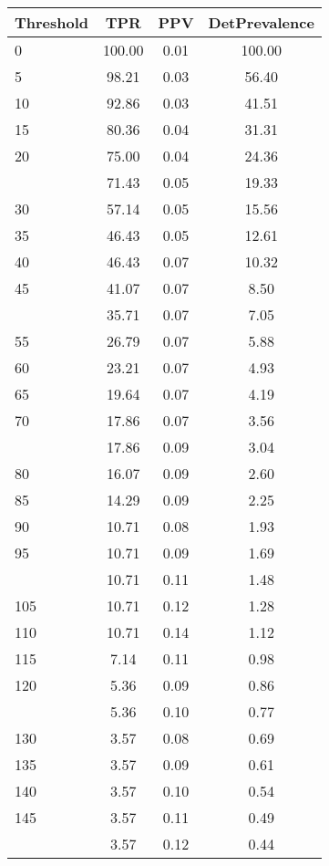 \begin{table}[ht]
\centering
\begin{tabular}{lccc}
  \toprule
Threshold & TPR & PPV & DetPrevalence \\ 
  \midrule
0 & 100.00 & 0.01 & 100.00 \\ 
  5 & 98.21 & 0.03 & 56.40 \\ 
  10 & 92.86 & 0.03 & 41.51 \\ 
  15 & 80.36 & 0.04 & 31.31 \\ 
  20 & 75.00 & 0.04 & 24.36 \\ 
   \addlinespace
25 & 71.43 & 0.05 & 19.33 \\ 
  30 & 57.14 & 0.05 & 15.56 \\ 
  35 & 46.43 & 0.05 & 12.61 \\ 
  40 & 46.43 & 0.07 & 10.32 \\ 
  45 & 41.07 & 0.07 & 8.50 \\ 
   \addlinespace
50 & 35.71 & 0.07 & 7.05 \\ 
  55 & 26.79 & 0.07 & 5.88 \\ 
  60 & 23.21 & 0.07 & 4.93 \\ 
  65 & 19.64 & 0.07 & 4.19 \\ 
  70 & 17.86 & 0.07 & 3.56 \\ 
   \addlinespace
75 & 17.86 & 0.09 & 3.04 \\ 
  80 & 16.07 & 0.09 & 2.60 \\ 
  85 & 14.29 & 0.09 & 2.25 \\ 
  90 & 10.71 & 0.08 & 1.93 \\ 
  95 & 10.71 & 0.09 & 1.69 \\ 
   \addlinespace
100 & 10.71 & 0.11 & 1.48 \\ 
  105 & 10.71 & 0.12 & 1.28 \\ 
  110 & 10.71 & 0.14 & 1.12 \\ 
  115 & 7.14 & 0.11 & 0.98 \\ 
  120 & 5.36 & 0.09 & 0.86 \\ 
   \addlinespace
125 & 5.36 & 0.10 & 0.77 \\ 
  130 & 3.57 & 0.08 & 0.69 \\ 
  135 & 3.57 & 0.09 & 0.61 \\ 
  140 & 3.57 & 0.10 & 0.54 \\ 
  145 & 3.57 & 0.11 & 0.49 \\ 
   \addlinespace
150 & 3.57 & 0.12 & 0.44 \\ 

\end{tabular}
\end{table}
